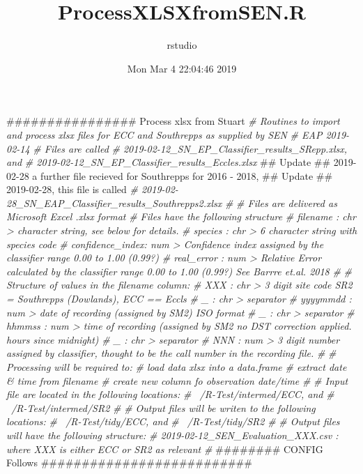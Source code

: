 \documentclass[]{article}
\title{ProcessXLSXfromSEN.R}
\author{rstudio}
\date{Mon Mar 4 22:04:46 2019}
\newenvironment{Shaded}{\begin{snugshade}}{\end{snugshade}}
\newcommand{\CommentTok}[1]{\textcolor[rgb]{0.56,0.35,0.01}{\textit{#1}}}
\newcommand{\NormalTok}[1]{#1}
\begin{document}
\maketitle

\begin{Shaded}
\begin{Highlighting}[]
\NormalTok{################ Process xlsx from Stuart}
\CommentTok{# Routines to import and process xlsx files for ECC and Southrepps as supplied by SEN}
\CommentTok{# EAP 2019-02-14}
\CommentTok{# Files are called}
\CommentTok{#   2019-02-12_SN_EP_Classifier_results_SRepp.xlsx, and}
\CommentTok{#   2019-02-12_SN_EP_Classifier_results_Eccles.xlsx}
\NormalTok{##  Update ## 2019-02-28 a further file recieved for Southrepps for 2016 - 2018,}
\NormalTok{##  Update ## 2019-02-28, this file is called}
\CommentTok{#   2019-02-28_SN_EAP_Classifier_results_Southrepps2.xlsx}
\CommentTok{#}
\CommentTok{# Files are delivered as Microsoft Excel .xlsx format}
\CommentTok{# Files have the following structure}
\CommentTok{#   filename        : chr > character string, see below for details.}
\CommentTok{#   species         : chr > 6 character string with species code}
\CommentTok{#   confidence_index: num > Confidence index assigned by the classifier range 0.00 to 1.00 (0.99?)}
\CommentTok{#   real_error      : num > Relative Error calculated by the classifier range 0.00 to 1.00 (0.99?) See Barrre et.al. 2018}
\CommentTok{#}
\CommentTok{# Structure of values in the filename column:}
\CommentTok{#   XXX             : chr > 3 digit site code  SR2 = Southrepps (Dowlands), ECC == Eccls}
\CommentTok{#   _               : chr > separator}
\CommentTok{#   yyyymmdd        : num > date of recording (assigned by SM2) ISO format}
\CommentTok{#   _               : chr > separator}
\CommentTok{#   hhmmss          : num > time of recording (assigned by SM2 no DST correction applied. hours since midnight)}
\CommentTok{#   _               : chr > separator}
\CommentTok{#   NNN              : num > 3 digit number assigned by classifier, thought to be the call number in the recording file.}
\CommentTok{#}
\CommentTok{# Processing will be required to:}
\CommentTok{#   load data xlsx into a data.frame}
\CommentTok{#   extract date & time from filename}
\CommentTok{#   create new column fo observation date/time}
\CommentTok{#}
\CommentTok{# Input file are located in the following locations:}
\CommentTok{#   ~/R-Test/intermed/ECC, and}
\CommentTok{#   ~/R-Test/intermed/SR2}
\CommentTok{#}
\CommentTok{# Output files will be writen to the following locations:}
\CommentTok{#   ~/R-Test/tidy/ECC, and}
\CommentTok{#   ~/R-Test/tidy/SR2}
\CommentTok{#}
\CommentTok{# Output files will have the following structure:}
\CommentTok{#   2019-02-12_SEN_Evaluation_XXX.csv : where XXX is either ECC or SR2 as relevant}
\CommentTok{#}
\NormalTok{########  CONFIG Follows ##########################}


\end{Highlighting}
\end{Shaded}
\end{document}
